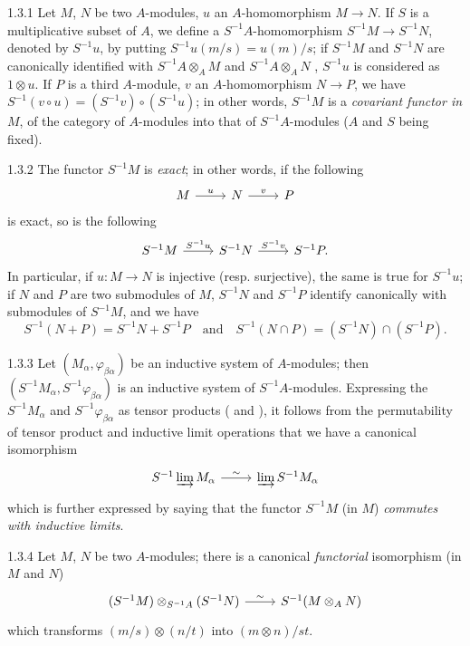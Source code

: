 \documentclass[../main.tex]{subfiles}
\begin{document}
\begin{env}{1.3.1}
Let $M$, $N$ be two $A$-modules, $u$ an $A$-homomorphism $M\to N$. If $S$ is a multiplicative subset of $A$,
we define a $S^{-1}A$-homomorphism $S^{-1}M\to S^{-1}N$, denoted by $S^{-1}u$, by putting
$S^{-1}u(m/s)=u(m)/s$; if $S^{-1}M$ and $S^{-1}N$ are canonically identified with $S^{-1}A\otimes_A M$ and
$S^{-1}A\otimes_A N$ , $S^{-1}u$ is considered as $1\otimes u$. If $P$ is a third $A$-module,
$v$ an $A$-homomorphism $N\to P$, we have $S^{-1}(v\circ u)=(S^{-1}v)\circ(S^{-1}u)$; in other words,
$S^{-1}M$ is a \emph{covariant functor in} $M$, of the category of $A$-modules into that of $S^{-1}A$-modules
($A$ and $S$ being fixed).
\end{env}

\begin{env}{1.3.2}
The functor $S^{-1}M$ is \emph{exact}; in other words, if the following
\[
  \begin{tikzcd}
    M\ar[r,"u"] & N\ar[r,"v"] & P
  \end{tikzcd}
\]
is exact, so is the following
\[
  \begin{tikzcd}
    S^{-1}M\ar[r,"S^{-1}u"] & S^{-1}N\ar[r,"S^{-1}v"] & S^{-1}P.
  \end{tikzcd}
\]
In particular, if $u\colon M\to N$ is injective (resp. surjective), the same is true for $S^{-1}u$;
 if $N$ and $P$ are two
submodules of $M$, $S^{-1}N$ and $S^{-1}P$ identify canonically with submodules of $S^{-1}M$, and we have
\[
  S^{-1}(N+P)=S^{-1}N+S^{-1}P\quad\text{and}\quad S^{-1}(N\cap P)=(S^{-1}N)\cap(S^{-1}P).
\]
\end{env}

\begin{env}{1.3.3}
Let $(M_\alpha,\varphi_{\beta\alpha})$ be an inductive system of $A$-modules; then
$(S^{-1}M_\alpha,S^{-1}\varphi_{\beta\alpha})$ is an inductive system of $S^{-1}A$-modules.
Expressing the $S^{-1}M_\alpha$ and $S^{-1}\varphi_{\beta\alpha}$ as tensor products ( and ),
it follows from the permutability of tensor product and inductive limit operations that we have a canonical isomorphism
\[
  \begin{tikzcd}
    S^{-1}\varinjlim M_\alpha\ar[r,"\sim"] &\varinjlim S^{-1}M_\alpha
  \end{tikzcd}
\]
which is further expressed by saying that the functor $S^{-1}M$ (in $M$) \emph{commutes with inductive limits}.
\end{env}

\begin{env}{1.3.4}
Let $M$, $N$ be two $A$-modules; there is a canonical \emph{functorial} isomorphism (in $M$ and $N$)
\[
  \begin{tikzcd}
    (S^{-1}M)\otimes_{S^{-1}A}(S^{-1}N)\ar[r,"\sim"] & S^{-1}(M\otimes_A N)
  \end{tikzcd}
\]
which transforms $(m/s)\otimes(n/t)$ into $(m\otimes n)/st$.
\end{env}
\end{document}
